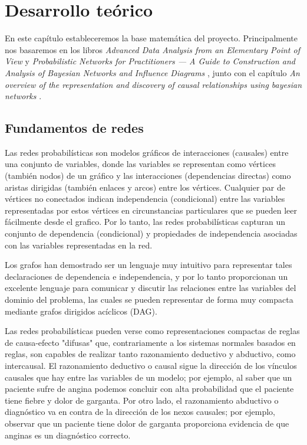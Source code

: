 \chapter{Desarrollo teórico}
En este capítulo estableceremos la base matemática del proyecto. Principalmente nos basaremos en 
los libros \textit{Advanced Data Analysis
from an Elementary Point of View} \cite{ada} y \textit{Probabilistic Networks for Practitioners — A
Guide to Construction and Analysis of Bayesian
Networks and Influence Diagrams} \cite{pgm}, junto con el capítulo \textit{An overview of the representation and 
discovery of causal relationships using bayesian networks} \cite{cooper}.

\section{Fundamentos de redes}
Las redes probabilísticas son modelos gráficos de interacciones (causales) entre una
conjunto de variables, donde las variables se representan como vértices (también nodos)
de un gráfico y las interacciones (dependencias directas) como aristas dirigidas (también
enlaces y arcos) entre los vértices. Cualquier par de vértices no conectados indican 
independencia (condicional) entre las variables representadas
por estos vértices en circunstancias particulares que se pueden leer fácilmente desde el
grafico. Por lo tanto, las redes probabilísticas capturan un conjunto de dependencia (condicional)
y propiedades de independencia asociadas con las variables representadas en la red.

Los grafos han demostrado ser un lenguaje muy intuitivo para representar
tales declaraciones de dependencia e independencia, y por lo tanto proporcionan un excelente
lenguaje para comunicar y discutir las relaciones entre las 
variables del dominio del problema, las cuales se pueden representar de forma muy compacta 
mediante grafos dirigidos acíclicos (DAG).

Las redes probabilísticas pueden verse como representaciones compactas de reglas de causa-efecto "difusas" 
que, contrariamente a los sistemas normales basados en reglas, son capables de realizar tanto razonamiento 
deductivo y abductivo, como intercausal. El razonamiento deductivo o causal
sigue la dirección de los vínculos causales que hay entre las variables de un modelo; por ejemplo, al saber
que un paciente sufre de angina podemos concluir con alta probabilidad que
el paciente tiene fiebre y dolor de garganta. Por otro lado, el razonamiento abductivo o diagnóstico 
va en contra de la dirección de los nexos causales; por ejemplo, observar
que un paciente tiene dolor de garganta proporciona evidencia de que anginas es un diagnóstico correcto.

